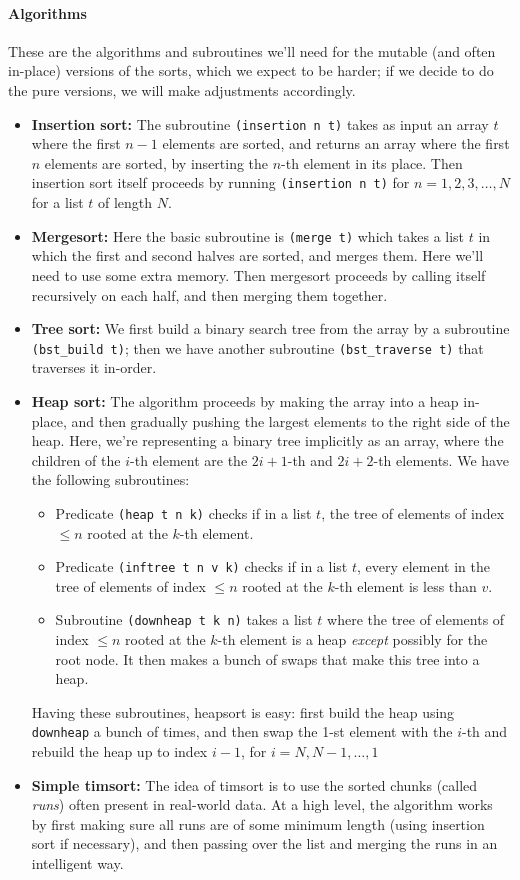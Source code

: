 \documentclass{article}
\begin{document}
\paragraph{Algorithms}
These are the algorithms and subroutines we'll need for the mutable (and often in-place) versions of the sorts, which we expect to be harder; if we decide to do the pure versions, we will make adjustments accordingly.
\begin{itemize}
  \item \textbf{Insertion sort:} The subroutine \verb|(insertion n t)| takes as input an array $t$ where the first $n-1$ elements are sorted, and returns an array where the first $n$ elements are sorted, by inserting the $n$-th element in its place. Then insertion sort itself proceeds by running \verb|(insertion n t)| for $n=1,2,3,\ldots,N$ for a list $t$ of length $N$. 
  \item \textbf{Mergesort:} Here the basic subroutine is \verb|(merge t)| which takes a list $t$ in which the first and second halves are sorted, and merges them. Here we'll need to use some extra memory. Then mergesort proceeds by calling itself recursively on each half, and then merging them together.
  \item \textbf{Tree sort:} We first build a binary search tree from the array by a subroutine \verb|(bst_build t)|; then we have another subroutine \verb|(bst_traverse t)| that traverses it in-order.
  \item \textbf{Heap sort:} The algorithm proceeds by making the array into a heap in-place, and then gradually pushing the largest elements to the right side of the heap. Here, we're representing a binary tree implicitly as an array, where the children of the $i$-th element are the $2i+1$-th and $2i+2$-th elements. We have the following subroutines:
  \begin{itemize}
	\item Predicate \verb|(heap t n k)| checks if in a list $t$, the tree of elements of index $\leq n$ rooted at the $k$-th element.
	\item Predicate \verb|(inftree t n v k)| checks if in a list $t$, every element in the tree of elements of index $\leq n$ rooted at the $k$-th element is less than $v$.
	\item Subroutine \verb|(downheap t k n)| takes a list $t$ where the tree of elements of index $\leq n$ rooted at the $k$-th element is a heap \emph{except} possibly for the root node. It then makes a bunch of swaps that make this tree into a heap. 
\end{itemize}
Having these subroutines, heapsort is easy: first build the heap using \verb|downheap| a bunch of times, and then swap the 1-st element with the $i$-th and rebuild the heap up to index $i-1$, for $i = N, N-1, \ldots, 1$
  \item \textbf{Simple timsort:} The idea of timsort is to use the sorted chunks (called \emph{runs}) often present in real-world data. At a high level, the algorithm works by first making sure all runs are of some minimum length (using insertion sort if necessary), and then passing over the list and merging the runs in an intelligent way. 
  

\end{itemize}
\end{document}
